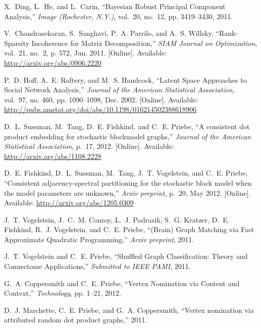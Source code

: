 \documentclass[10pt,journal,cspaper,compsoc]{IEEEtran}
\begin{document}
\begin{thebibliography}{10}
X.~Ding, L.~He, and L.~Carin, ``{Bayesian Robust Principal Component
  Analysis},'' \emph{Image (Rochester, N.Y.)}, vol.~20, no.~12, pp. 3419--3430,
  2011.

\BIBentryALTinterwordspacing
V.~Chandrasekaran, S.~Sanghavi, P.~A. Parrilo, and A.~S. Willsky,
  ``{Rank-Sparsity Incoherence for Matrix Decomposition},'' \emph{SIAM Journal
  on Optimization}, vol.~21, no.~2, p. 572, Jun. 2011. [Online]. Available:
  \url{http://arxiv.org/abs/0906.2220}
\BIBentrySTDinterwordspacing

\BIBentryALTinterwordspacing
P.~D. Hoff, A.~E. Raftery, and M.~S. Handcock, ``{Latent Space Approaches to
  Social Network Analysis},'' \emph{Journal of the American Statistical
  Association}, vol.~97, no. 460, pp. 1090--1098, Dec. 2002. [Online].
  Available: \url{http://pubs.amstat.org/doi/abs/10.1198/016214502388618906}
\BIBentrySTDinterwordspacing

\BIBentryALTinterwordspacing
D.~L. Sussman, M.~Tang, D.~E. Fishkind, and C.~E. Priebe, ``{A consistent dot
  product embedding for stochastic blockmodel graphs},'' \emph{Journal of the
  American Statistical Association}, p.~17, 2012. [Online]. Available:
  \url{http://arxiv.org/abs/1108.2228}
\BIBentrySTDinterwordspacing

\BIBentryALTinterwordspacing
D.~E. Fishkind, D.~L. Sussman, M.~Tang, J.~T. Vogelstein, and C.~E. Priebe,
  ``{Consistent adjacency-spectral partitioning for the stochastic block model
  when the model parameters are unknown},'' \emph{Arxiv preprint}, p.~20, May
  2012. [Online]. Available: \url{http://arxiv.org/abs/1205.0309}
\BIBentrySTDinterwordspacing

J.~T. Vogelstein, J.~C.~M. Conroy, L.~J. Podrazik, S.~G. Kratzer, D.~E.
  Fishkind, R.~J. Vogelstein, and C.~E. Priebe, ``{(Brain) Graph Matching via
  Fast Approximate Quadratic Programming},'' \emph{Arxiv preprint}, 2011.

J.~T. Vogelstein and C.~E. Priebe, ``{Shuffled Graph Classification: Theory and
  Connectome Applications},'' \emph{Submitted to IEEE PAMI}, 2011.

G.~A. Coppersmith and C.~E. Priebe, ``{Vertex Nomination via Content and
  Context},'' \emph{Technology}, pp. 1--21, 2012.

D.~J. Marchette, C.~E. Priebe, and G.~A. Coppersmith, ``{Vertex nomination via
  attributed random dot product graphs},'' 2011.


\end{thebibliography}
\end{document}
